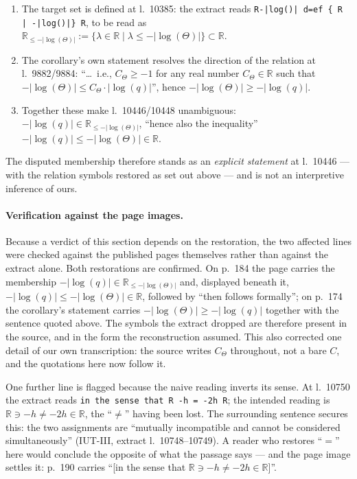\documentclass[11pt,a4paper]{article}
\theoremstyle{definition}
\newcommand{\anchor}[2]{(#1, extract l.~#2)}
\begin{document}
\begin{enumerate}
\item The target set is defined at l.~10385: the extract reads
  \texttt{R-|log()| d=ef \{ R | -|log()|\} R}, to be read as
  $\mathbb{R}_{\le -|\log(\Theta)|} := \{\lambda \in \mathbb{R} \mid
  \lambda \le -|\log(\Theta)|\} \subset \mathbb{R}$.
\item The corollary's own statement resolves the direction of the relation at
  l.~9882/9884: ``\dots\ i.e., $C_\Theta \ge -1$ for any real number
  $C_\Theta \in \mathbb{R}$ such that
  $-|\log(\Theta)| \le C_\Theta \cdot |\log(q)|$'', hence
  $-|\log(\Theta)| \ge -|\log(q)|$.
\item Together these make l.~10446/10448 unambiguous:
  $-|\log(q)| \in \mathbb{R}_{\le -|\log(\Theta)|}$, ``hence also the
  inequality'' $-|\log(q)| \le -|\log(\Theta)| \in \mathbb{R}$.
\end{enumerate}

The disputed membership therefore stands as an \emph{explicit statement} at
l.~10446 --- with the relation symbols restored as set out above --- and is not an
interpretive inference of ours.

\paragraph{Verification against the page images.} Because a verdict of this section
depends on the restoration, the two affected lines were checked against the
published pages themselves rather than against the extract alone. Both restorations
are confirmed. On p.~184 the page carries the membership
$-|\log(q)| \in \mathbb{R}_{\le -|\log(\Theta)|}$ and, displayed beneath it,
$-|\log(q)| \le -|\log(\Theta)| \in \mathbb{R}$, followed by ``then follows
formally''; on p.~174 the corollary's statement carries
$-|\log(\Theta)| \ge -|\log(q)|$ together with the sentence quoted above. The
symbols the extract dropped are therefore present in the source, and in the form
the reconstruction assumed. This also corrected one detail of our own transcription:
the source writes $C_\Theta$ throughout, not a bare $C$, and the quotations here now
follow it.

One further line is flagged because the naive reading inverts its sense. At
l.~10750 the extract reads \texttt{in the sense that R -h = -2h R}; the intended
reading is $\mathbb{R} \ni -h \neq -2h \in \mathbb{R}$, the ``$\neq$'' having been
lost. The surrounding sentence secures this: the two assignments are ``mutually
incompatible and cannot be considered simultaneously''
\anchor{IUT-III}{10748--10749}. A reader who restores ``$=$'' here would conclude
the opposite of what the passage says --- and the page image settles it: p.~190
carries ``[in the sense that $\mathbb{R} \ni -h \neq -2h \in \mathbb{R}$]''.
\end{document}
